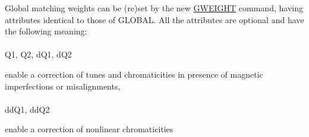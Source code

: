 Global matching weights can be (re)set by the new 
\href{gweight}{GWEIGHT}
command, having attributes identical to those of GLOBAL.
All the attributes are optional and have the following meaning:
\\\\Q1, Q2, dQ1, dQ2 

enable a correction of tunes and chromaticities in presence of magnetic imperfections or misalignments,
\\\\ddQ1, ddQ2

enable a correction of nonlinear chromaticities

%
%
% 
%

